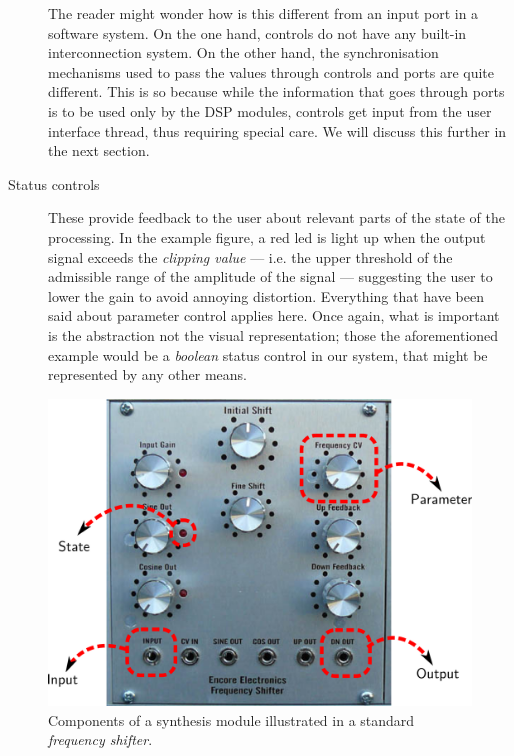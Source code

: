 \begin{description}
  The reader might wonder how is this different from an input port in
  a software system. On the one hand, controls do not have any
  built-in interconnection system. On the other hand, the
  synchronisation mechanisms used to pass the values through controls
  and ports are quite different. This is so because while the
  information that goes through ports is to be used only by the DSP
  modules, controls get input from the user interface thread, thus
  requiring special care. We will discuss this further in the next
  section.

\item[Status controls] These provide feedback to the user about
  relevant parts of the state of the processing. In the example
  figure, a red led is light up when the output signal exceeds the
  \emph{clipping value} --- i.e. the upper threshold of the admissible
  range of the amplitude of the signal --- suggesting the user to
  lower the gain to avoid annoying distortion. Everything that have
  been said about parameter control applies here. Once again, what is
  important is the abstraction not the visual representation; those
  the aforementioned example would be a \emph{boolean} status control in our
  system, that might be represented by any other means.
\end{description}

\begin{figure}
  \centering
  \includegraphics[width=.9\textwidth]{pic/hwmod.png}
  \caption{Components of a synthesis module illustrated in a standard
    \emph{frequency shifter}.}
  \label{fig:hwmod}
\end{figure}

